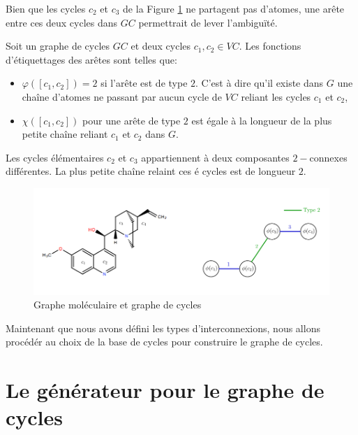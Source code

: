Bien que les cycles $c_2$ et $c_3$ de la Figure \ref{type2} ne partagent pas d'atomes, une arête entre ces deux cycles dans $GC$ permettrait de lever l'ambiguïté.

Soit un graphe de cycles $GC$ et deux cycles $c_1, c_2 \in VC$. Les fonctions d'étiquettages des arêtes sont telles que:

\begin{itemize}
\item $\varphi([c_1,c_2]) = 2 $ si l'arête est de type $2$. C'est à dire qu'il existe dans $G$ une chaîne d'atomes ne passant par aucun cycle de $VC$ reliant les cycles $c_1$ et $c_2$,
\item $\chi([c_1,c_2]) $ pour une arête de type $2$ est égale à la longueur de la plus petite chaîne reliant $c_1$ et $c_2$ dans $G$.
\end{itemize} 

\begin{exemple} Les cycles élémentaires $c_2$ et $c_3$ appartiennent à deux composantes $2-$connexes différentes. La plus petite chaîne relaint ces $é$ cycles est de longueur $2$.

\begin{figure}[H]
\label{type2}

\begin{center}
\includegraphics[scale=0.45]{type2_exemple.png}
\end{center}
\caption{Graphe moléculaire et graphe de cycles }
\end{figure}

\end{exemple}

Maintenant que nous avons défini les types d'interconnexions, nous allons procédér au choix de la base de cycles pour construire le graphe de cycles.

\section{ Le générateur pour le graphe de cycles}
\label{generateurcycles}


